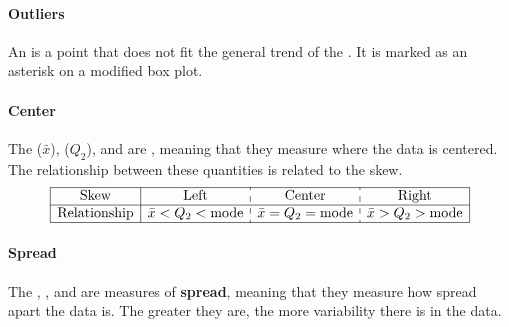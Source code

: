 \documentclass[../AP_Statistics.tex]{subfiles}
\begin{document}
				\paragraph{Outliers}
					An  is a point that does not fit the general trend of the . It is marked as an asterisk on a modified box plot. \\
				\paragraph{Center}
					The  ($\bar{x}$),  ($Q_2$), and  are , meaning that they measure where the data is centered. The relationship between these quantities is related to the skew.
					\[\begin{array}{|c|c:c:c|}\hline
						\rm{Skew} & \rm{Left} & \rm{Center} & \rm{Right} \\\hline
						\rm{Relationship} & \bar{x} < Q_2 < \rm{mode} & \bar{x} = Q_2 = \rm{mode} & \bar{x} > Q_2 > \rm{mode} \\\hline
					\end{array}\]
				\paragraph{Spread}
					The , , and  are measures of \textbf{spread}, meaning that they measure how spread apart the data is. The greater they are, the more variability there is in the data.
\end{document}

